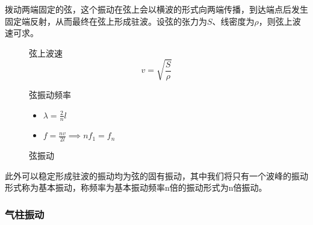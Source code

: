 拨动两端固定的弦，这个振动在弦上会以横波的形式向两端传播，到达端点后发生固定端反射，从而最终在弦上形成驻波。设弦的张力为$S$、线密度为$\rho$，则弦上波速可求。
\begin{figure}[ht!]
    \centering
    \begin{minipage}{0.48\textwidth}
        \begin{itembox}[l]{弦上波速}
            \begin{equation*}
                v=\sqrt{\frac{S}{\rho}}
            \end{equation*}
        \end{itembox}
        \begin{itembox}[l]{弦振动频率}
            \begin{itemize}
                \item $\lambda=\frac{2}{n}l$
                \item $f=\frac{nv}{2l}\implies nf_1=f_n$
            \end{itemize}
        \end{itembox}
    \end{minipage}
    \begin{minipage}{0.48\textwidth}
        \centering
        \caption{弦振动}
    \end{minipage}
\end{figure}
此外可以稳定形成驻波的振动均为弦的固有振动，其中我们将只有一个波峰的振动形式称为基本振动，称频率为基本振动频率n倍的振动形式为n倍振动。

\subsubsection{气柱振动}

